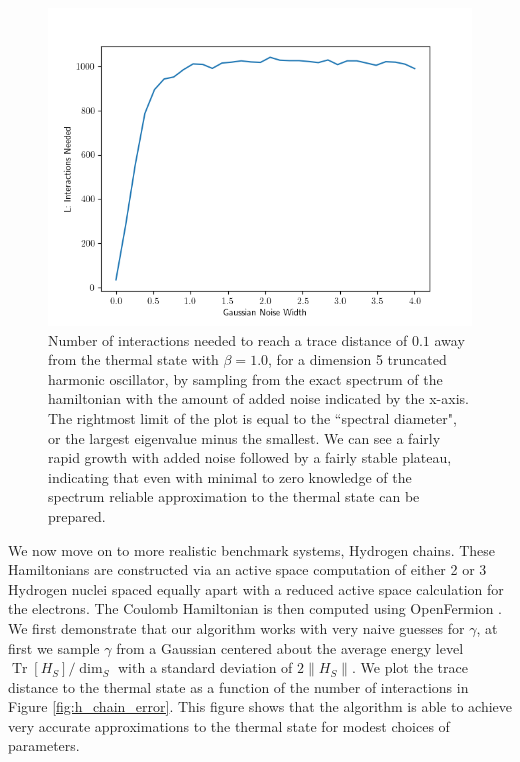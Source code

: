 \documentclass{article}
\newcommand{\matt}[1]{\todo[color=red!50, prepend, caption={Matt}, tickmarkheight=0.25cm]{#1}}
\newcommand{\brackets}[1]{\left[ #1 \right]}
\newcommand{\norm}[1]{\| #1 \|}
\DeclareMathOperator{\Tr}{Tr}
\newcommand{\trace}[1]{\Tr \brackets{ #1 }}
\begin{document}
\begin{figure}
    \centering
    \includegraphics[width=0.5\linewidth]{numerics/data/sho_with_noise_1.png}
    \caption{Number of interactions needed to reach a trace distance of $0.1$ away from the thermal state with $\beta = 1.0$, for a dimension 5 truncated harmonic oscillator, by sampling from the exact spectrum of the hamiltonian with the amount of added noise indicated by the x-axis. The rightmost limit of the plot is equal to the ``spectral diameter", or the largest eigenvalue minus the smallest. We can see a fairly rapid growth with added noise followed by a fairly stable plateau, indicating that even with minimal to zero knowledge of the spectrum reliable approximation to the thermal state can be prepared. }
    \label{fig:sho_with_noise}
\end{figure}

We now move on to more realistic benchmark systems, Hydrogen chains. These Hamiltonians are constructed via an active space computation of either 2 or 3 Hydrogen nuclei spaced equally apart with a reduced active space calculation for the electrons. The Coulomb Hamiltonian is then computed using OpenFermion \matt{CITE CITE CITE}. We first demonstrate that our algorithm works with very naive guesses for $\gamma$, at first we sample $\gamma$ from a Gaussian centered about the average energy level $\trace{H_S} / \dim_S$ with a standard deviation of $2 \norm{H_S}$. We plot the trace distance to the thermal state as a function of the number of interactions in Figure \ref{fig:h_chain_error}. This figure shows that the algorithm is able to achieve very accurate approximations to the thermal state for modest choices of parameters. 
\end{document}
